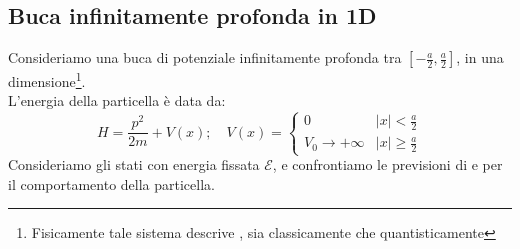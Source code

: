 \documentclass[../../FisicaTeorica.tex]{subfiles}
\begin{document}
\subsection{Buca infinitamente profonda in 1D}
\label{sec:buca_infinita_1D}
Consideriamo una buca di potenziale infinitamente profonda tra $[-\frac{a}{2},\frac{a}{2}]$, in una dimensione\footnote{Fisicamente tale sistema descrive , sia classicamente che quantisticamente}.\\
L'energia della particella è data da:
\[
H=\frac{p^2}{2m}+V(x); \quad V(x)=\begin{cases}
0 & |x|<\frac{a}{2}\\
V_0\to +\infty & |x|\geq \frac{a}{2}
\end{cases}
\]
Consideriamo gli stati con energia fissata $\mathcal{E}$, e confrontiamo le previsioni di \MC e \MQ per il comportamento della particella.
\end{document}
